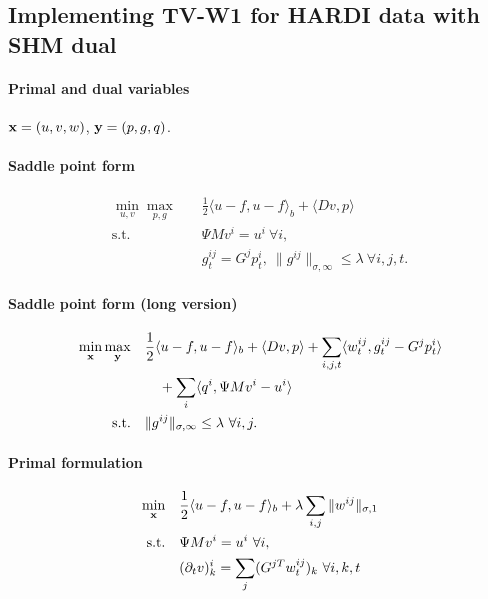 
\subsection{Implementing TV-W1 for HARDI data with SHM dual}

\paragraph{Primal and dual variables}
$\mathbf{x} = (u,v,w)$, $\mathbf{y} = (p,g,q)$.

\paragraph{Saddle point form}
\begin{align*}
    \min_{u,v} \max_{p,g} \quad
        & \frac{1}{2} \langle u - f, u - f \rangle_b + \langle Dv, p \rangle \\
    \text{s.t.}\quad
        & \Psi M v^i = u^i ~\forall i,  \\
        & g^{ij}_t = G^j p^i_t,
          ~\|g^{ij}\|_{\sigma,\infty} \leq \lambda ~\forall i,j,t.
\end{align*}

\paragraph{Saddle point form (long version)}
\begin{align*}
    \min_{\mathbf{x}} \max_{\mathbf{y}} \quad
        & \frac{1}{2} \langle u - f, u - f \rangle_b
            + \langle Dv, p \rangle
            + \sum_{i,j,t} \langle w^{ij}_t, g^{ij}_t - G^j p^i_t \rangle \\
        &\quad + \sum_{i} \langle q^i, \Psi M v^i - u^i \rangle \\
    \text{s.t.}\quad
        & \|g^{ij}\|_{\sigma,\infty} \leq \lambda ~\forall i,j.
\end{align*}

\paragraph{Primal formulation}
\begin{align*}
    \min_{\mathbf{x}} \quad
        & \frac{1}{2} \langle u - f, u - f \rangle_b
            + \lambda \sum_{i,j} \| w^{ij} \|_{\sigma,1} \\
    \text{s.t.}\quad
        & \Psi M v^i = u^i ~\forall i, \\
        & (\partial_t v)_k^i = \sum_j (G^{jT}w^{ij}_t)_{k} ~\forall i,k,t
\end{align*}


